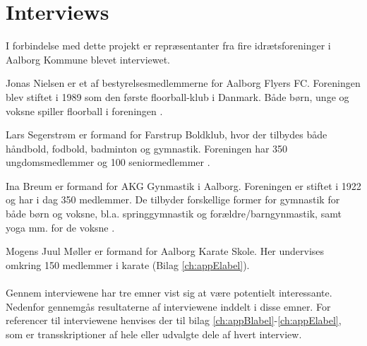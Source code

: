 \section{Interviews}\label{Interviews}
I forbindelse med dette projekt er repræsentanter fra fire idrætsforeninger i Aalborg Kommune blevet interviewet. 
\par
Jonas Nielsen er et af bestyrelsesmedlemmerne for Aalborg Flyers FC. Foreningen blev stiftet i 1989 som den første floorball-klub i Danmark. Både børn, unge og voksne spiller floorball i foreningen \citep{AalborgFlyers}.
\par
Lars Segerstrøm er formand for Farstrup Boldklub, hvor der tilbydes både håndbold, fodbold, badminton og gymnastik. Foreningen har 350 ungdomsmedlemmer og 100 seniormedlemmer \citep{Farstrup}.
\par
Ina Breum er formand for AKG Gynmastik i Aalborg. Foreningen er stiftet i 1922 og har i dag 350 medlemmer. De tilbyder forskellige former for gymnastik for både børn og voksne, bl.a. springgymnastik og forældre/barngynmastik, samt yoga mm. for de voksne \citep{AKG}.
\par
Mogens Juul Møller er formand for Aalborg Karate Skole. Her undervises omkring 150 medlemmer i karate (Bilag \ref{ch:appElabel}).
\\\\
Gennem interviewene har tre emner vist sig at være potentielt interessante. Nedenfor gennemgås resultaterne af interviewene inddelt i disse emner. For referencer til interviewene henvises der til bilag \ref{ch:appBlabel}-\ref{ch:appElabel}, som er transskriptioner af hele eller udvalgte dele af hvert interview.

